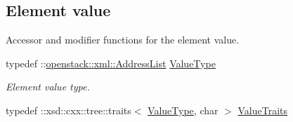 \subsection*{Element value}
\label{_amgrp2ee2eae1a8c390ea033f241c027da8d6}
Accessor and modifier functions for the element value. \begin{DoxyCompactItemize}
\item 
\hypertarget{classopenstack_1_1xml_1_1Public_a516611b9f05e3c307128c5d82c67a041}{
typedef ::\hyperlink{classopenstack_1_1xml_1_1AddressList}{openstack::xml::AddressList} \hyperlink{classopenstack_1_1xml_1_1Public_a516611b9f05e3c307128c5d82c67a041}{ValueType}}
\label{classopenstack_1_1xml_1_1Public_a516611b9f05e3c307128c5d82c67a041}

\begin{DoxyCompactList}\small\item\em Element value type. \item\end{DoxyCompactList}\item 
\hypertarget{classopenstack_1_1xml_1_1Public_a4b5d4dd280a772a724f2e6a3b151efbb}{
typedef ::xsd::cxx::tree::traits$<$ \hyperlink{classopenstack_1_1xml_1_1AddressList}{ValueType}, char $>$ \hyperlink{classopenstack_1_1xml_1_1Public_a4b5d4dd280a772a724f2e6a3b151efbb}{ValueTraits}}
\label{classopenstack_1_1xml_1_1Public_a4b5d4dd280a772a724f2e6a3b151efbb}


\end{DoxyCompactItemize}
